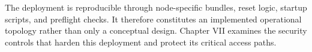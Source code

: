 The deployment is reproducible through node-specific bundles, reset logic, startup scripts, and preflight checks. It therefore constitutes an implemented operational topology rather than only a conceptual design. Chapter VII examines the security controls that harden this deployment and protect its critical access paths.
